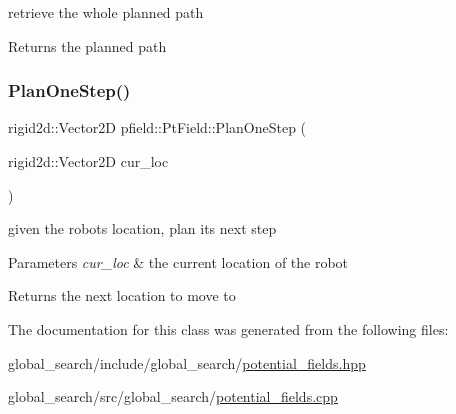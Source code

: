 retrieve the whole planned path 

\begin{DoxyReturn}{Returns}
the planned path 
\end{DoxyReturn}
\mbox{\label{classpfield_1_1PtField_af1faea5a1127d6df5e06727391227ade}} 
\subsubsection{\texorpdfstring{Plan\+One\+Step()}{PlanOneStep()}}
{\footnotesize\ttfamily rigid2d\+::\+Vector2D pfield\+::\+Pt\+Field\+::\+Plan\+One\+Step (\begin{DoxyParamCaption}\item[{rigid2d\+::\+Vector2D}]{cur\+\_\+loc }\end{DoxyParamCaption})}



given the robots location, plan its next step 


\begin{DoxyParams}{Parameters}
{\em cur\+\_\+loc} & the current location of the robot \\
\hline
\end{DoxyParams}
\begin{DoxyReturn}{Returns}
the next location to move to 
\end{DoxyReturn}


The documentation for this class was generated from the following files\+:\begin{DoxyCompactItemize}
\item 
global\+\_\+search/include/global\+\_\+search/\hyperlink{potential__fields_8hpp}{potential\+\_\+fields.\+hpp}\item 
global\+\_\+search/src/global\+\_\+search/\hyperlink{potential__fields_8cpp}{potential\+\_\+fields.\+cpp}\end{DoxyCompactItemize}
